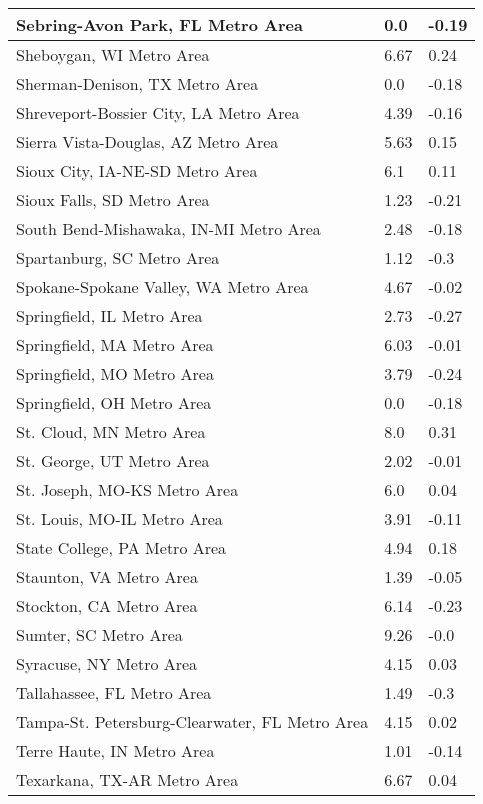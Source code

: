 \documentclass[12pt,oneside, letterpaper]{book}
\begin{document}
\begin{longtable}{| p{} | p{} | p{} |}
    Sebring-Avon Park, FL Metro Area & 0.0 & -0.19 \\ \hline
    Sheboygan, WI Metro Area & 6.67 & 0.24 \\ \hline
    Sherman-Denison, TX Metro Area & 0.0 & -0.18 \\ \hline
    Shreveport-Bossier City, LA Metro Area & 4.39 & -0.16 \\ \hline
    Sierra Vista-Douglas, AZ Metro Area & 5.63 & 0.15 \\ \hline
    Sioux City, IA-NE-SD Metro Area & 6.1 & 0.11 \\ \hline
    Sioux Falls, SD Metro Area & 1.23 & -0.21 \\ \hline
    South Bend-Mishawaka, IN-MI Metro Area & 2.48 & -0.18 \\ \hline
    Spartanburg, SC Metro Area & 1.12 & -0.3 \\ \hline
    Spokane-Spokane Valley, WA Metro Area & 4.67 & -0.02 \\ \hline
    Springfield, IL Metro Area & 2.73 & -0.27 \\ \hline
    Springfield, MA Metro Area & 6.03 & -0.01 \\ \hline
    Springfield, MO Metro Area & 3.79 & -0.24 \\ \hline
    Springfield, OH Metro Area & 0.0 & -0.18 \\ \hline
    St. Cloud, MN Metro Area & 8.0 & 0.31 \\ \hline
    St. George, UT Metro Area & 2.02 & -0.01 \\ \hline
    St. Joseph, MO-KS Metro Area & 6.0 & 0.04 \\ \hline
    St. Louis, MO-IL Metro Area & 3.91 & -0.11 \\ \hline
    State College, PA Metro Area & 4.94 & 0.18 \\ \hline
    Staunton, VA Metro Area & 1.39 & -0.05 \\ \hline
    Stockton, CA Metro Area & 6.14 & -0.23 \\ \hline
    Sumter, SC Metro Area & 9.26 & -0.0 \\ \hline
    Syracuse, NY Metro Area & 4.15 & 0.03 \\ \hline
    Tallahassee, FL Metro Area & 1.49 & -0.3 \\ \hline
    Tampa-St. Petersburg-Clearwater, FL Metro Area & 4.15 & 0.02 \\ \hline
    Terre Haute, IN Metro Area & 1.01 & -0.14 \\ \hline
    Texarkana, TX-AR Metro Area & 6.67 & 0.04 \\ \hline

\end{longtable}
\end{document}
